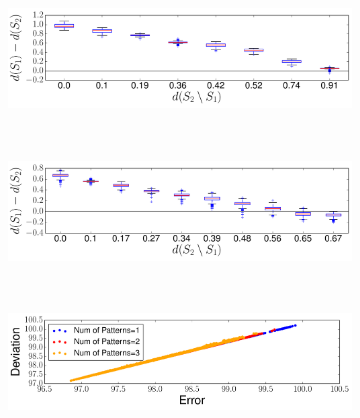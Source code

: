 \begin{figure}[h!]
	\captionsetup[subfigure]{justification=centering}
    \centering
    \begin{subfigure}[b]{0.48\textwidth}
        \centering
        \includegraphics[width=\textwidth]{QueryLogSummarization/graphics/ContainmentCapturesDeviation_BankData.pdf}
        \label{fig:containmentcapturesdeviation_bankdata}
    \end{subfigure}
        ~
    \begin{subfigure}[b]{0.48\textwidth}
        \centering
        \includegraphics[width=\textwidth]{QueryLogSummarization/graphics/ContainmentCapturesDeviation_PocketData.pdf}
        \label{fig:containmentcapturesdeviation_pocketdata}
    \end{subfigure}
    ~
    \begin{subfigure}[b]{0.485\textwidth}
        \centering
         \includegraphics[width=\textwidth]{QueryLogSummarization/graphics/ErrorCapturesDeviation_BankData.pdf}
        \label{fig:errorcapturesdeviation_bankdata}
    \end{subfigure}
        ~
    \begin{subfigure}[b]{0.485\textwidth}

\end{subfigure}
\end{figure}
